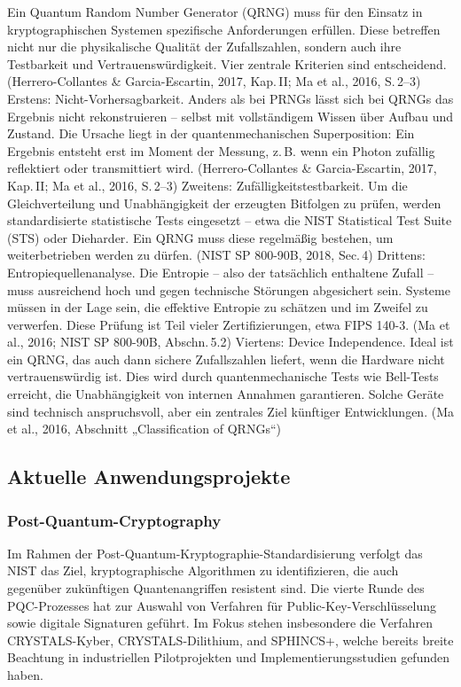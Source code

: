 \noindent
Ein Quantum Random Number Generator (QRNG) muss für den Einsatz in kryptographischen Systemen spezifische Anforderungen erfüllen. Diese betreffen nicht nur die physikalische Qualität der Zufallszahlen, sondern auch ihre Testbarkeit und Vertrauenswürdigkeit. Vier zentrale Kriterien sind entscheidend.
 (Herrero-Collantes & Garcia-Escartin, 2017, Kap. II; Ma et al., 2016, S. 2–3)
Erstens: Nicht-Vorhersagbarkeit. Anders als bei PRNGs lässt sich bei QRNGs das Ergebnis nicht rekonstruieren – selbst mit vollständigem Wissen über Aufbau und Zustand. Die Ursache liegt in der quantenmechanischen Superposition: Ein Ergebnis entsteht erst im Moment der Messung, z. B. wenn ein Photon zufällig reflektiert oder transmittiert wird.
 (Herrero-Collantes & Garcia-Escartin, 2017, Kap. II; Ma et al., 2016, S. 2–3)
Zweitens: Zufälligkeitstestbarkeit. Um die Gleichverteilung und Unabhängigkeit der erzeugten Bitfolgen zu prüfen, werden standardisierte statistische Tests eingesetzt – etwa die NIST Statistical Test Suite (STS) oder Dieharder. Ein QRNG muss diese regelmäßig bestehen, um weiterbetrieben werden zu dürfen.
 (NIST SP 800-90B, 2018, Sec. 4)
Drittens: Entropiequellenanalyse. Die Entropie – also der tatsächlich enthaltene Zufall – muss ausreichend hoch und gegen technische Störungen abgesichert sein. Systeme müssen in der Lage sein, die effektive Entropie zu schätzen und im Zweifel zu verwerfen. Diese Prüfung ist Teil vieler Zertifizierungen, etwa FIPS 140-3.
 (Ma et al., 2016; NIST SP 800-90B, Abschn. 5.2)
Viertens: Device Independence. Ideal ist ein QRNG, das auch dann sichere Zufallszahlen liefert, wenn die Hardware nicht vertrauenswürdig ist. Dies wird durch quantenmechanische Tests wie Bell-Tests erreicht, die Unabhängigkeit von internen Annahmen garantieren. Solche Geräte sind technisch anspruchsvoll, aber ein zentrales Ziel künftiger Entwicklungen.
 (Ma et al., 2016, Abschnitt „Classification of QRNGs“)
 

\subsection{Aktuelle Anwendungsprojekte}
\subsubsection{Post-Quantum-Cryptography}
\cite{}
Im Rahmen der Post-Quantum-Kryptographie-Standardisierung verfolgt das NIST das Ziel, kryptographische Algorithmen zu identifizieren, die auch gegenüber zukünftigen Quantenangriffen resistent sind. Die vierte Runde des PQC-Prozesses hat zur Auswahl von Verfahren für Public-Key-Verschlüsselung sowie digitale Signaturen geführt. Im Fokus stehen insbesondere die Verfahren CRYSTALS-Kyber, CRYSTALS-Dilithium, and SPHINCS+, welche bereits breite Beachtung in industriellen Pilotprojekten und Implementierungsstudien gefunden haben.


